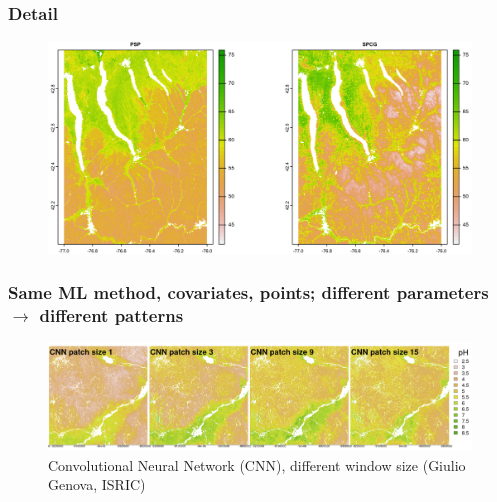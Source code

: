 \documentclass[aspectratio=169, 10pt]{beamer}
\begin{document}
\begin{frame}
  \frametitle{Detail}
\begin{figure}
    \centering
    \includegraphics[height=0.7\textheight]{./graphics_david/Fig07b.png}
 \end{figure}
\end{frame}


\begin{frame}
  \frametitle{\textbf{Same} ML method, covariates, points; different
    \textbf{parameters} $\to$ different patterns}
    \begin{figure}
        \centering
        \includegraphics[width=\textwidth]{./graphics_david/GenovaPosterFig1a.png}
        \\{Convolutional Neural Network (CNN), different window size (Giulio Genova, ISRIC)}
    \end{figure}
\end{frame}
\end{document}
